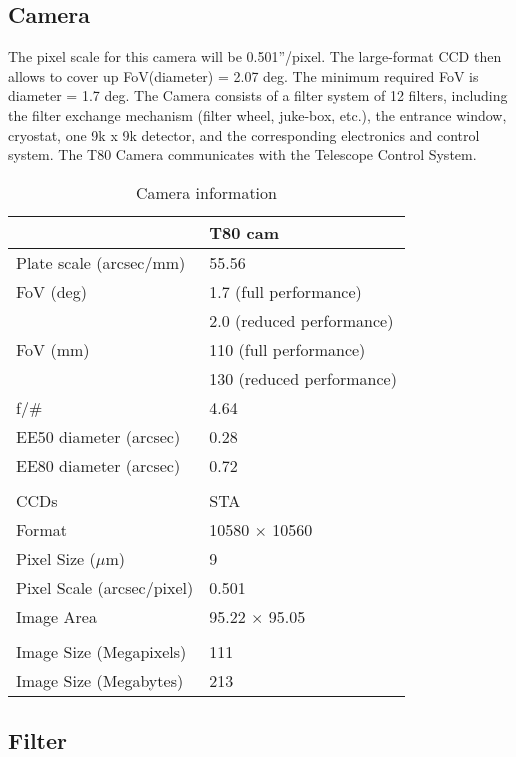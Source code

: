 \documentclass[12pt,preprint]{aastex}
\begin{document}
\subsection{Camera}

The pixel scale for this camera will be 0.501''/pixel. The large-format CCD then allows to cover up FoV(diameter) = 2.07 deg. The minimum required FoV is diameter = 1.7 deg. The Camera consists of a filter system of 12 filters, including the filter exchange mechanism (filter wheel, juke-box, etc.), the entrance window, cryostat, one 9k x 9k detector, and the corresponding electronics and control system. The T80 Camera communicates with the Telescope Control System.

\begin{table*}
 \centering
   \label{table:result}
    \begin{minipage}{140mm}
\caption{Camera information}   
                       
\begin{tabular}{l l}     %
\hline\hline       
  &T80 cam   \\
\hline                    
Plate scale (arcsec/mm)      &  55.56 \\
FoV (deg) &  1.7 (full performance)\\
  & 2.0 (reduced performance) \\
 FoV (mm) & 110 (full performance)   \\
 & 130 (reduced performance) \\
 f/$\#$ & 4.64 \\
 EE50 diameter (arcsec) & 0.28 \\
 EE80 diameter (arcsec) & 0.72 \\
  & \\
 CCDs & STA \\
 Format & 10580 $\times$ 10560 \\
 Pixel Size ($\mu$m) & 9 \\
 Pixel Scale (arcsec/pixel) & 0.501 \\
 Image Area & 95.22 $\times$ 95.05 \\
 & \\
 Image Size (Megapixels) & 111 \\
 Image Size (Megabytes) & 213 \\
\hline                  
\end{tabular}
\end{minipage}
\end{table*}   

\subsection{Filter}
\end{document}

